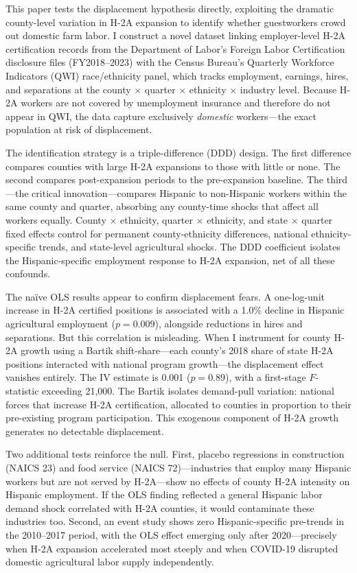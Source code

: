 \documentclass[12pt]{article}
\begin{document}
This paper tests the displacement hypothesis directly, exploiting the dramatic county-level variation in H-2A expansion to identify whether guestworkers crowd out domestic farm labor. I construct a novel dataset linking employer-level H-2A certification records from the Department of Labor's Foreign Labor Certification disclosure files (FY2018--2023) with the Census Bureau's Quarterly Workforce Indicators (QWI) race/ethnicity panel, which tracks employment, earnings, hires, and separations at the county $\times$ quarter $\times$ ethnicity $\times$ industry level. Because H-2A workers are not covered by unemployment insurance and therefore do not appear in QWI, the data capture exclusively \textit{domestic} workers---the exact population at risk of displacement.

The identification strategy is a triple-difference (DDD) design. The first difference compares counties with large H-2A expansions to those with little or none. The second compares post-expansion periods to the pre-expansion baseline. The third---the critical innovation---compares Hispanic to non-Hispanic workers within the same county and quarter, absorbing any county-time shocks that affect all workers equally. County $\times$ ethnicity, quarter $\times$ ethnicity, and state $\times$ quarter fixed effects control for permanent county-ethnicity differences, national ethnicity-specific trends, and state-level agricultural shocks. The DDD coefficient isolates the Hispanic-specific employment response to H-2A expansion, net of all these confounds.

The na\"ive OLS results appear to confirm displacement fears. A one-log-unit increase in H-2A certified positions is associated with a 1.0\% decline in Hispanic agricultural employment ($p = 0.009$), alongside reductions in hires and separations. But this correlation is misleading. When I instrument for county H-2A growth using a Bartik shift-share---each county's 2018 share of state H-2A positions interacted with national program growth---the displacement effect vanishes entirely. The IV estimate is 0.001 ($p = 0.89$), with a first-stage $F$-statistic exceeding 21,000. The Bartik isolates demand-pull variation: national forces that increase H-2A certification, allocated to counties in proportion to their pre-existing program participation. This exogenous component of H-2A growth generates no detectable displacement.

Two additional tests reinforce the null. First, placebo regressions in construction (NAICS 23) and food service (NAICS 72)---industries that employ many Hispanic workers but are not served by H-2A---show no effects of county H-2A intensity on Hispanic employment. If the OLS finding reflected a general Hispanic labor demand shock correlated with H-2A counties, it would contaminate these industries too. Second, an event study shows zero Hispanic-specific pre-trends in the 2010--2017 period, with the OLS effect emerging only after 2020---precisely when H-2A expansion accelerated most steeply and when COVID-19 disrupted domestic agricultural labor supply independently.
\end{document}
